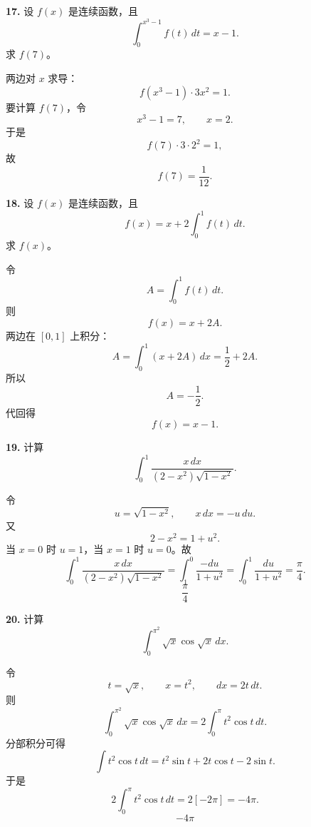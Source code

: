 \begin{problemblock}
\textbf{17.} 设 \(f(x)\) 是连续函数，且
\[
\int_0^{x^3-1}f(t)\,dt=x-1.
\]
求 \(f(7)\)。
\end{problemblock}

\begin{solutionblock}
两边对 \(x\) 求导：
\[
f(x^3-1)\cdot 3x^2=1.
\]
要计算 \(f(7)\)，令
\[
x^3-1=7,\qquad x=2.
\]
于是
\[
f(7)\cdot 3\cdot 2^2=1,
\]
故
\[
\boxed{f(7)=\frac1{12}}.
\]
\end{solutionblock}

\begin{problemblock}
\textbf{18.} 设 \(f(x)\) 是连续函数，且
\[
f(x)=x+2\int_0^1f(t)\,dt.
\]
求 \(f(x)\)。
\end{problemblock}

\begin{solutionblock}
令
\[
A=\int_0^1f(t)\,dt.
\]
则
\[
f(x)=x+2A.
\]
两边在 \([0,1]\) 上积分：
\[
A=\int_0^1(x+2A)\,dx=\frac12+2A.
\]
所以
\[
A=-\frac12.
\]
代回得
\[
\boxed{f(x)=x-1}.
\]
\end{solutionblock}

\begin{problemblock}
\textbf{19.} 计算
\[
\int_0^1\frac{x\,dx}{(2-x^2)\sqrt{1-x^2}}.
\]
\end{problemblock}

\begin{solutionblock}
令
\[
u=\sqrt{1-x^2},\qquad x\,dx=-u\,du.
\]
又
\[
2-x^2=1+u^2.
\]
当 \(x=0\) 时 \(u=1\)，当 \(x=1\) 时 \(u=0\)。故
\[
\int_0^1\frac{x\,dx}{(2-x^2)\sqrt{1-x^2}}
=\int_1^0\frac{-du}{1+u^2}
=\int_0^1\frac{du}{1+u^2}
=\frac{\pi}{4}.
\]
\[
\boxed{\frac{\pi}{4}}
\]
\end{solutionblock}

\begin{problemblock}
\textbf{20.} 计算
\[
\int_0^{\pi^2}\sqrt{x}\cos\sqrt{x}\,dx.
\]
\end{problemblock}

\begin{solutionblock}
令
\[
t=\sqrt{x},\qquad x=t^2,\qquad dx=2t\,dt.
\]
则
\[
\int_0^{\pi^2}\sqrt{x}\cos\sqrt{x}\,dx
=2\int_0^\pi t^2\cos t\,dt.
\]
分部积分可得
\[
\int t^2\cos t\,dt=t^2\sin t+2t\cos t-2\sin t.
\]
于是
\[
2\int_0^\pi t^2\cos t\,dt
=2[-2\pi]
=-4\pi.
\]
\[
\boxed{-4\pi}
\]
\end{solutionblock}

